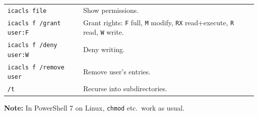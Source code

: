 \begin{tabularx}{\linewidth}{lX}
    \texttt{icacls file} & Show permissions.\\
    \texttt{icacls f /grant user:F} & Grant rights: \texttt{F} full, \texttt{M} modify, \texttt{RX} read+execute, \texttt{R} read, \texttt{W} write.\\
    \texttt{icacls f /deny user:W} & Deny writing.\\
    \texttt{icacls f /remove user} & Remove user's entries.\\
    \texttt{/t} & Recurse into subdirectories.\\
    \hline
\end{tabularx}

\textbf{Note:} In PowerShell 7 on Linux, \texttt{chmod} etc.\ work as usual.
